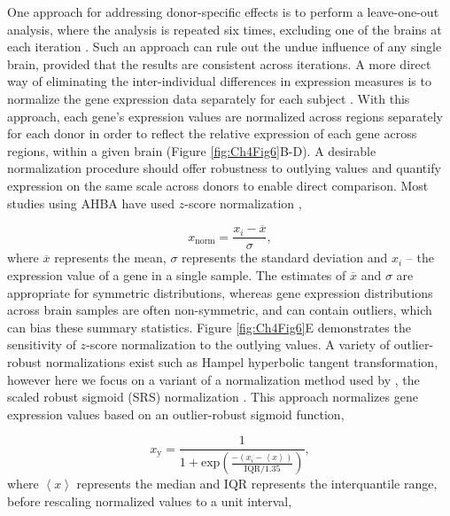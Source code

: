 One approach for addressing donor-specific effects is to perform a leave-one-out analysis, where the analysis is repeated six times, excluding one of the brains at each iteration  \citep{Parkes2017,McColgan2018}. Such an approach can rule out the undue influence of any single brain, provided that the results are consistent across iterations. A more direct way of eliminating the inter-individual differences in expression measures is to normalize the gene expression data separately for each subject \citep{Richiardi2015,Whitaker2016a,Vertes2016b,Rizzo2016,Liu2017,Negi2017,Burt2018,McColgan2018,Romero-Garcia2018a}. With this approach, each gene’s expression values are normalized across regions separately for each donor in order to reflect the relative expression of each gene across regions, within a given brain (Figure \ref{fig:Ch4Fig6}B-D). A desirable normalization procedure should offer robustness to outlying values and quantify expression on the same scale across donors to enable direct comparison. Most studies using AHBA have used $z$-score normalization \citep{Rizzo2016,Whitaker2016a,Vertes2016b,Negi2017,Romero-Garcia2018a},

\begin{equation}
    \label{eqn:eq1}
    x_\mathrm{norm} = \frac{x_\mathrm{\textit{i}}-\overline{x}}{\sigma},
\end{equation}
where $\overline{x}$ represents the mean, $\sigma$ represents the standard deviation and $x_\mathrm{\textit{i}}$ -- the expression value of a gene in a single sample. The estimates of $\overline{x}$ and $\sigma$ are appropriate for symmetric distributions, whereas gene expression distributions across brain samples are often non-symmetric, and can contain outliers, which can bias these summary statistics. Figure \ref{fig:Ch4Fig6}E demonstrates the sensitivity of $z$-score normalization to the outlying values.
A variety of outlier-robust normalizations exist such as Hampel hyperbolic tangent transformation, however here we focus on a variant of a normalization method used by \citet{Fulcher2016}, the scaled robust sigmoid (SRS) normalization \citep{Fulcher2013}. This approach normalizes gene expression values based on an outlier-robust sigmoid function,

\begin{equation}
    \label{eqn:eq2}
    x_\mathrm{y} = \frac{1}{1+\mathrm{exp}({\frac{-(x_\mathrm{\textit{i}}-\left\langle x \right\rangle)}{\mathrm{IQR}/1.35}})},
\end{equation}
where $\left\langle x \right\rangle$ represents the median and $\mathrm{IQR}$ represents the interquantile range, before rescaling normalized values to a unit interval,

